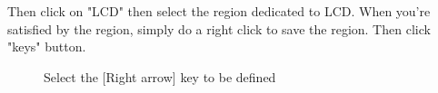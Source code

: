 \documentclass[10pt]{report}
\newcommand{\calckey}[1]{\textsf{[#1]}}
\begin{document}
Then click on "LCD" then select the region dedicated to LCD.\newline
When you're satisfied by the region, simply do a right click to save the region.\newline\newline
Then click "keys" button.\newline 
\begin{figure}[H]
\centering
{}
\caption{Select the \calckey{Right arrow} key to be defined}
\end{figure}
\end{document}

